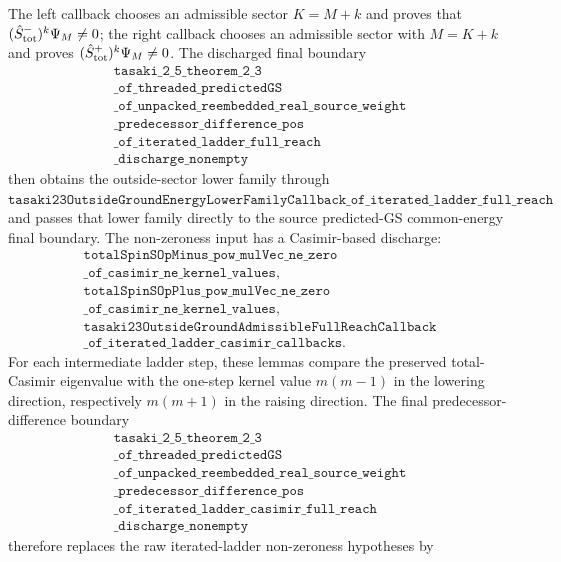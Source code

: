 \documentclass[a4paper,11pt]{article}
\begin{document}
The left callback chooses an admissible sector \(K=M+k\) and proves
that \((\hat S^-_{\rm tot})^k\Psi_M\ne0\); the right callback chooses
an admissible sector with \(M=K+k\) and proves
\((\hat S^+_{\rm tot})^k\Psi_M\ne0\).  The discharged final boundary
\[
\begin{gathered}
\texttt{tasaki\_2\_5\_theorem\_2\_3}\\
\texttt{\_of\_threaded\_predictedGS}\\
\texttt{\_of\_unpacked\_reembedded\_real\_source\_weight}\\
\texttt{\_predecessor\_difference\_pos}\\
\texttt{\_of\_iterated\_ladder\_full\_reach}\\
\texttt{\_discharge\_nonempty}
\end{gathered}
\]
then obtains the outside-sector lower family through
\(\texttt{tasaki23OutsideGroundEnergyLowerFamilyCallback\_of\_iterated\_ladder\_full\_reach}\)
and passes that lower family directly to the source predicted-GS common-energy
final boundary.
The non-zeroness input has a Casimir-based discharge:
\[
\begin{gathered}
\texttt{totalSpinSOpMinus\_pow\_mulVec\_ne\_zero}\\
\texttt{\_of\_casimir\_ne\_kernel\_values},\\
\texttt{totalSpinSOpPlus\_pow\_mulVec\_ne\_zero}\\
\texttt{\_of\_casimir\_ne\_kernel\_values},\\
\texttt{tasaki23OutsideGroundAdmissibleFullReachCallback}\\
\texttt{\_of\_iterated\_ladder\_casimir\_callbacks}.
\end{gathered}
\]
For each intermediate ladder step, these lemmas compare the preserved
total-Casimir eigenvalue with the one-step kernel value
\(m(m-1)\) in the lowering direction, respectively \(m(m+1)\) in the
raising direction.  The final predecessor-difference boundary
\[
\begin{gathered}
\texttt{tasaki\_2\_5\_theorem\_2\_3}\\
\texttt{\_of\_threaded\_predictedGS}\\
\texttt{\_of\_unpacked\_reembedded\_real\_source\_weight}\\
\texttt{\_predecessor\_difference\_pos}\\
\texttt{\_of\_iterated\_ladder\_casimir\_full\_reach}\\
\texttt{\_discharge\_nonempty}
\end{gathered}
\]
therefore replaces the raw iterated-ladder non-zeroness hypotheses by
\end{document}
